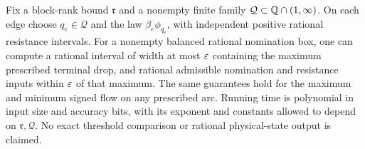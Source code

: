 \begin{theorem}
\label{thm:a-law-fractional}
Fix a block-rank bound $\mathfrak r$ and a nonempty finite family
$\mathcal Q\subset\mathbb{Q}\cap(1,\infty)$. On each edge choose $q_e\in\mathcal Q$
and the law $\beta_e\phi_{q_e}$, with independent positive rational
resistance intervals. For a nonempty balanced rational nomination box,
one can compute a rational interval of width at most $\varepsilon$ containing
the maximum prescribed terminal drop, and rational admissible nomination
and resistance inputs within $\varepsilon$ of that maximum. The same guarantees
hold for the maximum and minimum signed flow on any prescribed arc.
Running time is polynomial in input size and accuracy bits, with its
exponent and constants allowed to depend on $\mathfrak r,\mathcal Q$.
No exact threshold comparison or rational physical-state output is claimed.
\end{theorem}
